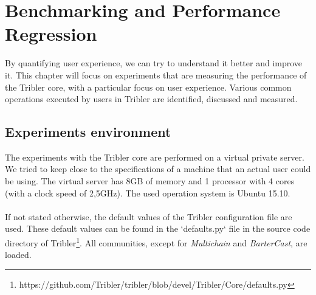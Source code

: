 \label{chapter:experiments}
\chapter{Benchmarking and Performance Regression}

By quantifying user experience, we can try to understand it better and improve it. This chapter will focus on experiments that are measuring the performance of the Tribler core, with a particular focus on user experience. Various common operations executed by users in Tribler are identified, discussed and measured.

\section{Experiments environment}
The experiments with the Tribler core are performed on a virtual private server. We tried to keep close to the specifications of a machine that an actual user could be using. The virtual server has 8GB of memory and 1 processor with 4 cores (with a clock speed of 2,5GHz). The used operation system is Ubuntu 15.10.\\\\
If not stated otherwise, the default values of the Tribler configuration file are used. These default values can be found in the `defaults.py` file in the source code directory of Tribler\footnote{https://github.com/Tribler/tribler/blob/devel/Tribler/Core/defaults.py}. All communities, except for \emph{Multichain} and \emph{BarterCast}, are loaded.

